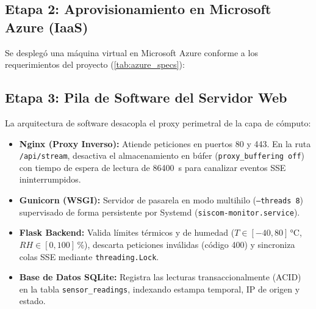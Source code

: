\documentclass[conference]{IEEEtran}
\begin{document}
\subsection{Etapa 2: Aprovisionamiento en Microsoft Azure (IaaS)}
Se desplegó una máquina virtual en Microsoft Azure conforme a los requerimientos del proyecto (\autoref{tab:azure_specs}):

\begin{table}[htbp]
\centering
\caption{Especificaciones de la máquina virtual en la nube (Azure).}
\label{tab:azure_specs}
\end{table}

\subsection{Etapa 3: Pila de Software del Servidor Web}
La arquitectura de software desacopla el proxy perimetral de la capa de cómputo:
\begin{itemize}
    \item \textbf{Nginx (Proxy Inverso):} Atiende peticiones en puertos 80 y 443. En la ruta \texttt{/api/stream}, desactiva el almacenamiento en búfer (\texttt{proxy\_buffering off}) con tiempo de espera de lectura de \SI{86400}{\second} para canalizar eventos SSE ininterrumpidos.
    \item \textbf{Gunicorn (WSGI):} Servidor de pasarela en modo multihilo (\texttt{--threads 8}) supervisado de forma persistente por Systemd (\texttt{siscom-monitor.service}).
    \item \textbf{Flask Backend:} Valida límites térmicos y de humedad ($T \in [-40, 80]\,\si{\celsius}$, $RH \in [0, 100]\,\si{\percent}$), descarta peticiones inválidas (código 400) y sincroniza colas SSE mediante \texttt{threading.Lock}.
    \item \textbf{Base de Datos SQLite:} Registra las lecturas transaccionalmente (ACID) en la tabla \texttt{sensor\_readings}, indexando estampa temporal, IP de origen y estado.
\end{itemize}
\end{document}
